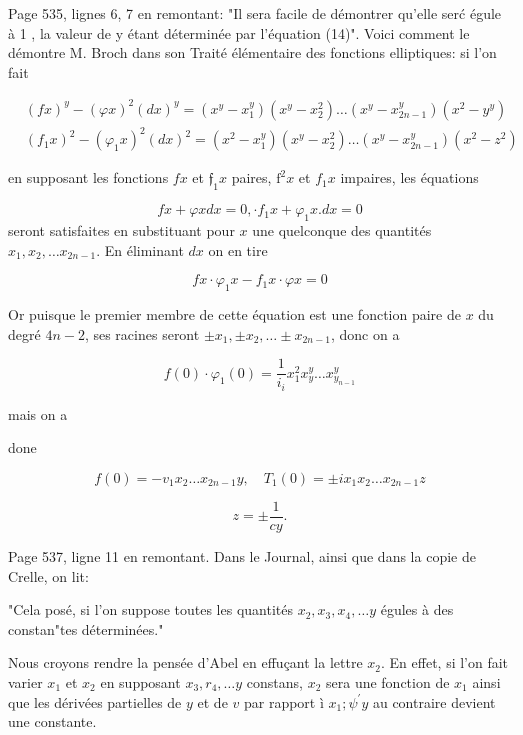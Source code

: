 \documentclass{article}
\begin{document}
Page 535, lignes 6, 7 en remontant: "Il sera facile de démontrer qu'elle serć égule à 1 , la valeur de y étant déterminée par l'équation (14)". Voici comment le démontre M. Broch dans son Traité élémentaire des fonctions elliptiques: si l'on fait

\[
\begin{aligned}
& (f x)^{y}-(\varphi x)^{2}(d x)^{y}=\left(x^{y}-x_{1}^{y}\right)\left(x^{y}-x_{2}^{2}\right) \ldots\left(x^{y}-x_{2 n-1}^{y}\right)\left(x^{2}-y^{y}\right) \\
& \left(f_{1} x\right)^{2}-\left(\varphi_{1} x\right)^{2}(d x)^{2}=\left(x^{2}-x_{1}^{y}\right)\left(x^{y}-x_{2}^{2}\right) \ldots\left(x^{y}-x_{2 n-1}^{y}\right)\left(x^{2}-z^{2}\right)
\end{aligned}
\]

en supposant les fonctions \(f x\) et \(\mathfrak{f}_{1} x\) paires, \(\mathrm{f}^{2} x\) et \(f_{1} x\) impaires, les équations

\[
f x+\varphi x d x=0, \cdot f_{1} x+\varphi_{1} x . d x=0
\]
seront satisfaites en substituant pour \(x\) une quelconque des quantités \(x_{1}, x_{2}, \ldots x_{2 n-1}\). En éliminant \(d x\) on en tire

\[
f x \cdot \varphi_{1} x-f_{1} x \cdot \varphi x=0
\]

Or puisque le premier membre de cette équation est une fonction paire de \(x\) du degré \(4 n-2\), ses racines seront \(\pm x_{1}, \pm x_{2}, \ldots \pm x_{2 n-1}\), donc on a

\[
f(0) \cdot \varphi_{1}(0)=\frac{1}{i_{i}} x_{1}^{2} x_{y}^{y} \ldots x_{y_{n-1}}^{y}
\]

mais on a

done

\[
f(0)=-v_{1} x_{2} \ldots x_{2 n-1} y, \quad T_{1}(0)= \pm i x_{1} x_{2} \ldots x_{2 n-1} z
\]

\[
z= \pm \frac{1}{c y} .
\]

Page 537, ligne 11 en remontant. Dans le Journal, ainsi que dans la copie de Crelle, on lit:

"Cela posé, si l'on suppose toutes les quantités \(x_{2}, x_{3}, x_{4}, \ldots y\) égules à des constan"tes déterminées."

Nous croyons rendre la pensée d'Abel en effuçant la lettre \(x_{2}\). En effet, si l'on fait varier \(x_{1}\) et \(x_{2}\) en supposant \(x_{3}, r_{4}, \ldots y\) constans, \(x_{2}\) sera une fonction de \(x_{1}\) ainsi que les dérivées partielles de \(y\) et de \(v\) par rapport ì \(x_{1} ; \psi^{\prime} y\) au contraire devient une constante.
\end{document}
